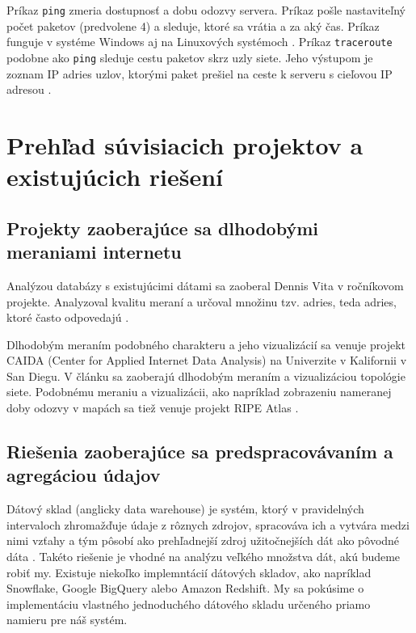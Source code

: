 Príkaz \lstinline{ping} zmeria dostupnosť a dobu odozvy servera. Príkaz pošle nastaviteľný počet paketov (predvolene 4) a sleduje, 
ktoré sa vrátia a za aký čas. Príkaz funguje v systéme Windows \cite{ping_windows} aj na Linuxových systémoch \cite{ping_linux}.
Príkaz \lstinline{traceroute} podobne ako \lstinline{ping} sleduje cestu paketov skrz uzly siete. Jeho výstupom je zoznam IP adries uzlov, ktorými paket prešiel 
na ceste k serveru s cieľovou IP adresou \cite{tracert}. 

\section{Prehľad súvisiacich projektov a existujúcich riešení}

\subsection{Projekty zaoberajúce sa dlhodobými meraniami internetu}

Analýzou databázy s existujúcimi dátami sa zaoberal Dennis Vita v ročníkovom projekte. Analyzoval kvalitu meraní a určoval množinu tzv.  
adries, teda adries, ktoré často odpovedajú \cite{vita_report}.

Dlhodobým meraním podobného charakteru a jeho vizualizácií sa venuje projekt CAIDA (Center for Applied Internet Data Analysis) na Univerzite 
v Kalifornii v San Diegu. V článku \cite{caida} sa zaoberajú dlhodobým meraním a vizualizáciou topológie siete. Podobnému meraniu a vizualizácii, 
ako napríklad zobrazeniu nameranej doby odozvy v mapách sa tiež venuje projekt RIPE Atlas \cite{atlas_ripe}.

\subsection{Riešenia zaoberajúce sa predspracovávaním a agregáciou údajov}

Dátový sklad (anglicky data warehouse) je systém, ktorý v pravidelných intervaloch zhromažďuje údaje z rôznych zdrojov, 
spracováva ich a vytvára medzi nimi vzťahy a tým pôsobí ako prehľadnejší zdroj užitočnejších dát ako pôvodné dáta \cite{data_warehouse}. 
Takéto riešenie je vhodné na analýzu veľkého množstva dát, akú budeme robiť my. Existuje niekoľko implemntácií 
dátových skladov, ako napríklad Snowflake, Google BigQuery alebo Amazon Redshift. My sa pokúsime o implementáciu vlastného jednoduchého 
dátového skladu určeného priamo namieru pre náš systém.